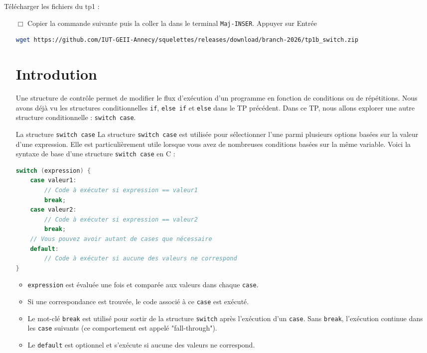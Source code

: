 
Télécharger les fichiers du tp1 :
     \begin{itemize}
	      \item[$\Box$] Copier la commande suivante puis la coller la dans le terminal \texttt{Maj-INSER}. Appuyer sur Entrée
        \begin{lstlisting}[language=bash,style=console]
wget https://github.com/IUT-GEII-Annecy/squelettes/releases/download/branch-2026/tp1b_switch.zip
\end{lstlisting}
\section{Introdution}
Une structure de contrôle permet de modifier le flux d'exécution d'un programme en fonction de conditions ou de répétitions.
Nous avons déjà vu les structures conditionnelles \texttt{if}, \texttt{else if} et \texttt{else} dans le TP précédent.
Dans ce TP, nous allons explorer une autre structure conditionnelle : \texttt{switch case}.


\begin{UPSTIinfor}{La structure \texttt{switch case}}
	La structure \texttt{switch case} est utilisée pour sélectionner l'une parmi plusieurs options basées sur la valeur d'une expression.
	Elle est particulièrement utile lorsque vous avez de nombreuses conditions basées sur la même variable.
	Voici la syntaxe de base d'une structure \texttt{switch case} en C :
	\begin{lstlisting}[language=c]
switch (expression) {
    case valeur1:
        // Code à exécuter si expression == valeur1
        break;
    case valeur2:
        // Code à exécuter si expression == valeur2
        break;
    // Vous pouvez avoir autant de cases que nécessaire
    default:
        // Code à exécuter si aucune des valeurs ne correspond
}
\end{lstlisting}
	\begin{itemize}
		\item \texttt{expression} est évaluée une fois et comparée aux valeurs dans chaque \texttt{case}.
		\item Si une correspondance est trouvée, le code associé à ce \texttt{case} est exécuté.
		\item Le mot-clé \texttt{break} est utilisé pour sortir de la structure \texttt{switch} après l'exécution d'un \texttt{case}. Sans \texttt{break}, l'exécution continue dans les \texttt{case} suivants (ce comportement est appelé "fall-through").
		\item Le \texttt{default} est optionnel et s'exécute si aucune des valeurs ne correspond.
	\end{itemize}
\end{UPSTIinfor}


\end{itemize}
